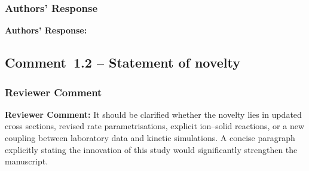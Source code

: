 \documentclass[12pt]{article}
\newcommand{\reviewlabel}{\textbf{\textcolor{commentframe}{Reviewer Comment:}}}
\newcommand{\responselabel}{\textbf{\textcolor{responseframe}{Authors' Response:}}}
\begin{document}
\subsubsection{Authors' Response}
\begin{responsebox}
\responselabel{} 

\end{responsebox}

\subsection{Comment~1.2 -- Statement of novelty}

\subsubsection{Reviewer Comment}
\begin{reviewerbox}
\reviewlabel{} It should be clarified whether the novelty lies in updated
cross sections, revised rate parametrisations, explicit ion--solid reactions,
or a new coupling between laboratory data and kinetic simulations. A concise
paragraph explicitly stating the innovation of this study would significantly
strengthen the manuscript.
\end{reviewerbox}
\end{document}
